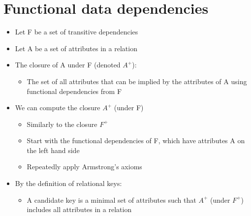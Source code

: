 \documentclass{article}[18pt]
\begin{document}
\section{Functional data dependencies}
\begin{itemize}
	\item Let F be a set of transitive dependencies
	\item Let A be a set of attributes in a relation
	\item The closure of A under F (denoted $A^+$):
	\begin{itemize}
		\item The set of all attributes that can be implied by the attributes of A using functional dependencies from F
	\end{itemize}
	\item We can compute the closure $A^+$ (under F)
	\begin{itemize}
		\item Similarly to the closure $F^+$
		\item Start with the functional dependencies of F, which have attributes A on the left hand side
		\item Repeatedly apply Armstrong's axioms
	\end{itemize}
	\item By the definition of relational keys:
	\begin{itemize}
		\item A candidate key is a minimal set of attributes such that $A^+$ (under $F^+$) includes all attributes in a relation
	\end{itemize}
\end{itemize}
\end{document}
